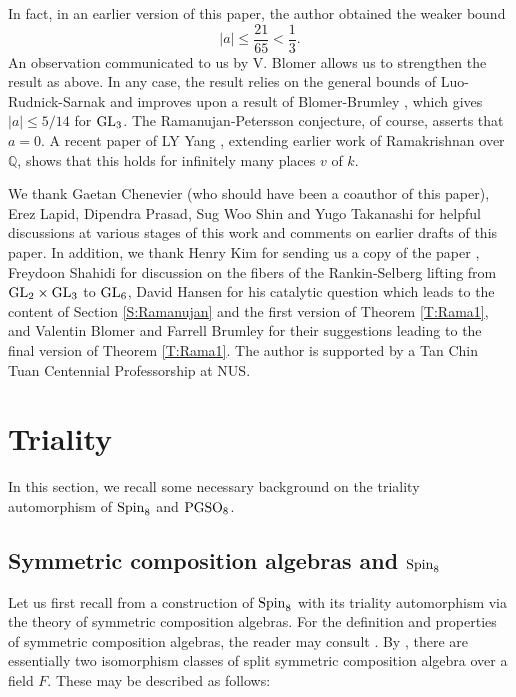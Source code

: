 \documentclass[11pt]{amsart}
\theoremstyle{plain}
\numberwithin{equation}{section}
\newcommand{\Q}{\mathbb Q}
\def\PGSO{{\rm PGSO}}
\def\Spin{{\rm Spin}}
\def\Spin{{\rm Spin}}
\def\GL{{\rm GL}}
\begin{document}
In fact, in an earlier version of this paper, the author obtained the weaker bound
\[  |a| \leq \frac{21}{65} < \frac{1}{3}. \] 
An observation communicated to us by V. Blomer allows us to strengthen the result as above. In any case, the result  relies on the general bounds of Luo-Rudnick-Sarnak \cite{LRS} and improves upon a result of Blomer-Brumley \cite{BB}, which gives $|a| \leq 5/14$  for $\GL_3$.  The Ramanujan-Petersson conjecture, of course,  asserts that $a =0$. A recent paper of LY Yang \cite{Y}, extending earlier work of Ramakrishnan \cite{Ra3} over $\Q$, shows that this holds for infinitely many places $v$ of $k$.    
\vskip 10pt

     We thank Gaetan Chenevier (who should have been a coauthor of this paper),  Erez Lapid, Dipendra Prasad, Sug Woo Shin  and Yugo Takanashi for helpful discussions at various stages of this work and comments on earlier drafts of this paper. In addition, we thank Henry Kim for sending us a copy of the paper \cite{KS3}, Freydoon Shahidi for discussion on the fibers of the Rankin-Selberg  lifting from $\GL_2 \times \GL_3$ to $\GL_6$, David Hansen for his catalytic question which leads to the content of Section \ref{S:Ramanujan} and the first version  of Theorem \ref{T:Rama1}, and Valentin Blomer and Farrell Brumley for their suggestions leading to the final version of Theorem \ref{T:Rama1}. 
  The author is  supported by a Tan Chin Tuan Centennial Professorship at NUS. 

  

\vskip 10pt




\section{\bf Triality}  \label{S:triality}

 In this section, we recall some necessary background on the triality automorphism of $\Spin_8$ and $\PGSO_8$.  
 
 
 \vskip 5pt
 

 \subsection{\bf Symmetric composition algebras and $\Spin_8$}
 Let us first recall from \cite[\S 2]{ChG} a construction of $\Spin_8$ with its triality automorphism  via the theory of symmetric composition algebras. For the definition and properties of symmetric composition algebras, the reader may consult \cite{KMRT}. 
 By \cite[Theorem 34.37]{KMRT},  there are essentially two  isomorphism classes of   split symmetric composition algebra over a field $F$.  These may be described as follows:
 \vskip 5pt
 
\end{document}
